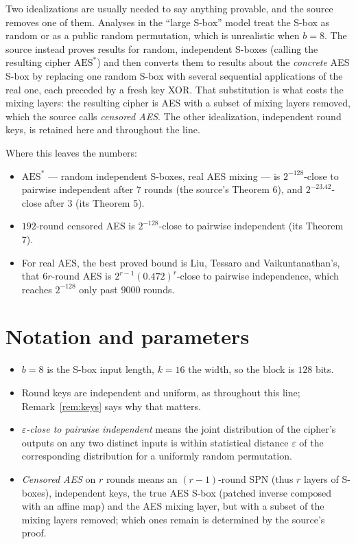 \documentclass{aicr-conjecture}
\newcommand{\eps}{\varepsilon}
\begin{document}
Two idealizations are usually needed to say anything provable, and the
source removes one of them. Analyses in the ``large S-box'' model treat
the S-box as random or as a public random permutation, which is
unrealistic when $b = 8$. The source instead proves results for random,
independent S-boxes (calling the resulting cipher $\mathrm{AES}^{\ast}$)
and then converts them to results about the \emph{concrete} AES S-box by
replacing one random S-box with several sequential applications of the
real one, each preceded by a fresh key XOR\@. That substitution is what
costs the mixing layers: the resulting cipher is AES with a subset of
mixing layers removed, which the source calls \emph{censored AES}. The
other idealization, independent round keys, is retained here and
throughout the line.

Where this leaves the numbers:

\begin{itemize}[nosep]
  \item $\mathrm{AES}^{\ast}$ --- random independent S-boxes, real AES
    mixing --- is $2^{-128}$-close to pairwise independent after $7$
    rounds (the source's Theorem 6), and $2^{-23.42}$-close after $3$
    (its Theorem 5).
  \item $192$-round censored AES is $2^{-128}$-close to pairwise
    independent (its Theorem 7).
  \item For real AES, the best proved bound is
    Liu, Tessaro and Vaikuntanathan's, that $6r$-round AES is
    $2^{r-1}(0.472)^{r}$-close to pairwise independence, which reaches
    $2^{-128}$ only past $9000$ rounds.
\end{itemize}

\section{Notation and parameters}\label{sec:notation}

\begin{itemize}[nosep]
  \item $b = 8$ is the S-box input length, $k = 16$ the width, so the
    block is $128$ bits.
  \item Round keys are independent and uniform, as throughout this line;
    Remark~\ref{rem:keys} says why that matters.
  \item \emph{$\eps$-close to pairwise independent} means the joint
    distribution of the cipher's outputs on any two distinct inputs is
    within statistical distance $\eps$ of the corresponding distribution
    for a uniformly random permutation.
  \item \emph{Censored AES} on $r$ rounds means an $(r-1)$-round SPN
    (thus $r$ layers of S-boxes), independent keys, the true AES S-box
    (patched inverse composed with an affine map) and the AES mixing
    layer, but with a subset of the mixing layers removed; which ones
    remain is determined by the source's proof.
\end{itemize}
\end{document}
